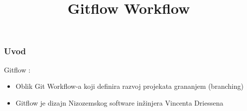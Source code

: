 \documentclass{beamer}
\title{Gitflow Workflow}
\begin{document}
\maketitle{}
\begin{frame}
\frametitle{Uvod}
Gitflow :
\begin{itemize}
\item Oblik Git Workflow-a koji definira razvoj projekata grananjem (branching)
\item Gitflow je dizajn Nizozemskog software inžinjera Vincenta Driessena
\end{itemize}
\end{frame}
\end{document}
